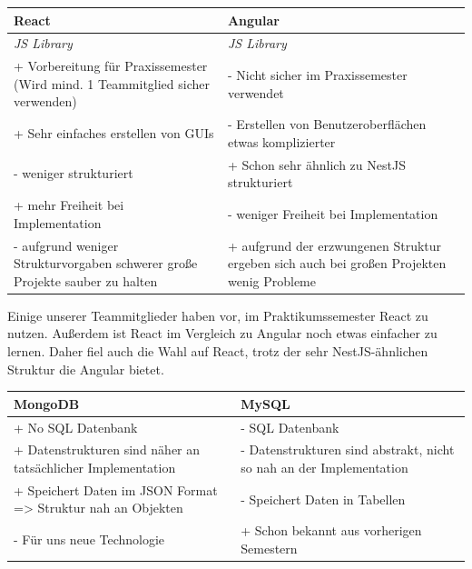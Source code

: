 \begin{table}[!h]
    \centering
    \begin{tabular}{|l|l|} 
    \hline
    \textbf{React}                                                                      & \textbf{Angular}                                                                    \\ 
    \hline
    \emph{JS Library}                                                             & \emph{JS Library}                                                           \\ 
    \hline
    + Vorbereitung für Praxissemester (Wird mind. 1 Teammitglied sicher verwenden) & - Nicht sicher im Praxissemester verwendet                \\ 
    \hline
    + Sehr einfaches erstellen von GUIs                & - Erstellen von Benutzeroberflächen etwas komplizierter  \\ 
    \hline
    - weniger strukturiert                                        & + Schon sehr ähnlich zu NestJS strukturiert        \\ 
    \hline
    + mehr Freiheit bei Implementation                    & - weniger Freiheit bei Implementation                                  \\ 
    \hline
    - aufgrund weniger Strukturvorgaben schwerer große Projekte sauber zu halten                               & + aufgrund der erzwungenen Struktur ergeben sich auch bei großen Projekten wenig Probleme                           \\
    \hline
    \end{tabular}
    \end{table}

Einige unserer Teammitglieder haben vor, im Praktikumssemester React zu nutzen. 
Außerdem ist React im Vergleich zu Angular noch etwas einfacher zu lernen.
Daher fiel auch die Wahl auf React, trotz der sehr NestJS-ähnlichen Struktur die Angular bietet.


\begin{table}[!h]
    \centering
    \begin{tabular}{|l|l|} 
    \hline
    \textbf{MongoDB}                                                                      & \textbf{MySQL}                                                                    \\ 
    \hline
    + No SQL Datenbank & - SQL Datenbank               \\ 
    \hline
    + Datenstrukturen sind näher an tatsächlicher Implementation                & - Datenstrukturen sind abstrakt, nicht so nah an der Implementation  \\ 
    \hline
    + Speichert Daten im JSON Format => Struktur nah an Objekten                                        & - Speichert Daten in Tabellen        \\ 
    \hline
    - Für uns neue Technologie                   & + Schon bekannt aus vorherigen Semestern                                  \\ 
    \hline
    \end{tabular}
    \end{table}

